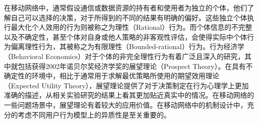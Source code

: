 在移动网络中，通常假设通信或数据资源的持有者和使用者为独立的个体，他们了解自己可以选择的决策，对于所得到的不同的结果有明确的偏好。这些独立个体执行最大化个人效用的行为则被称之为理性（Rational）行为。而个体信息的不完整以及不确定性，甚至个体对自身或他人策略的非客观性评估，会使得实际中个体行为偏离理性行为，其被称之为有限理性（Bounded-rational）行为。行为经济学（Behavioral Economics）对于个体的非完全理性行为有着广泛且深入的研究，其中就包括获得2002年诺贝尔奖经济学奖的展望理论（Prospect Theory）\cite{Kahneman}。在具有不确定性的环境中，相比于通常用于求解最优策略所使用的期望效用理论（Expected Utility Theory），展望理论提供了对于决策制定在行为心理学上更加准确的描述，从相关实验研究的结果上看其更加贴近真实中的情况。在移动网络的一些问题场景中，展望理论有着较大的应用价值。在移动网络中的机制设计中，充分的考虑不同用户行为模型上的异质性是至关重要的。



